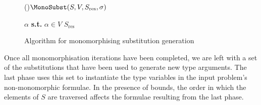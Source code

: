 \documentclass[runningheads]{llncs}
\begin{document}
\begin{figure}[t!]
   \begin{algorithm}[H]


   \Fn(){\(\MonoSubst(S, V, S_{\text{res}}, \sigma)\)}{


   \BlankLine

   \eIf{\(V = \emptyset\)}{
    \Return \(S_{\text{res}}\cup\{\sigma\}\)\;%
   }
   {
      \Let \(\alpha \) \textbf{s.t.} \(\alpha\in V\)\;
      \Return \(S_{\text{res}}\)\;
   }
   }


\end{algorithm}
\caption{Algorithm for monomorphising substitution generation}
\label{mono_substs}
\end{figure}

Once all monomorphisation iterations have been completed, we are left with a set of the substitutions that have been used to generate new type arguments. The last phase uses this set to instantiate the type variables in the input problem's non-monomorphic formulae. In the presence of bounds, the order in which the elements of \(S\) are traversed affects the formulae resulting from the last phase. %
\end{document}
